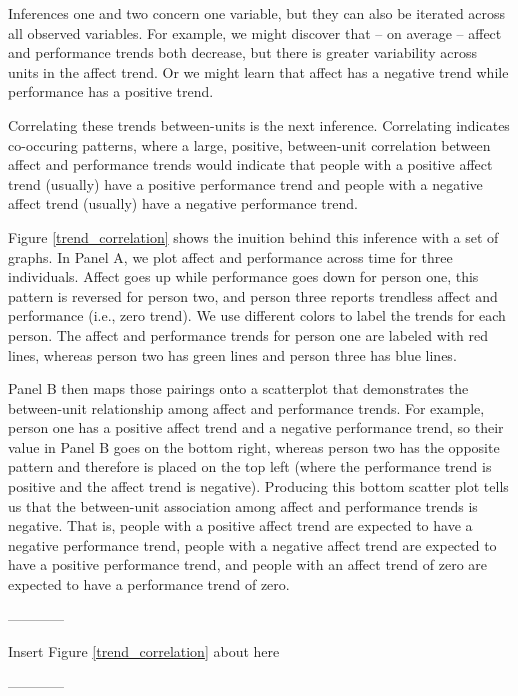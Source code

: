 \documentclass[english,,man]{apa6}
\theoremstyle{definition}
\theoremstyle{definition}
\theoremstyle{definition}
\theoremstyle{remark}
\begin{document}
Inferences one and two concern one variable, but they can also be
iterated across all observed variables. For example, we might discover
that -- on average -- affect and performance trends both decrease, but
there is greater variability across units in the affect trend. Or we
might learn that affect has a negative trend while performance has a
positive trend.

Correlating these trends between-units is the next inference.
Correlating indicates co-occuring patterns, where a large, positive,
between-unit correlation between affect and performance trends would
indicate that people with a positive affect trend (usually) have a
positive performance trend and people with a negative affect trend
(usually) have a negative performance trend.

Figure \ref{trend_correlation} shows the inuition behind this inference
with a set of graphs. In Panel A, we plot affect and performance across
time for three individuals. Affect goes up while performance goes down
for person one, this pattern is reversed for person two, and person
three reports trendless affect and performance (i.e., zero trend). We
use different colors to label the trends for each person. The affect and
performance trends for person one are labeled with red lines, whereas
person two has green lines and person three has blue lines.

Panel B then maps those pairings onto a scatterplot that demonstrates
the between-unit relationship among affect and performance trends. For
example, person one has a positive affect trend and a negative
performance trend, so their value in Panel B goes on the bottom right,
whereas person two has the opposite pattern and therefore is placed on
the top left (where the performance trend is positive and the affect
trend is negative). Producing this bottom scatter plot tells us that the
between-unit association among affect and performance trends is
negative. That is, people with a positive affect trend are expected to
have a negative performance trend, people with a negative affect trend
are expected to have a positive performance trend, and people with an
affect trend of zero are expected to have a performance trend of zero.

\begin{center}

------------

Insert Figure \ref{trend_correlation} about here

------------

\end{center}
\end{document}
